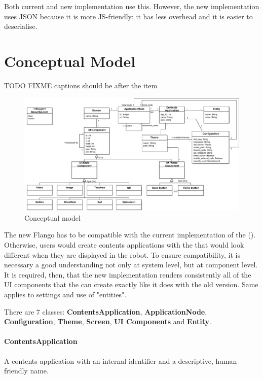 Both current and new implementation use this.
However, the new implementation uses \ac{JSON} because it is more \ac{JS}-friendly: it has less overhead and it is easier to deserialise.


\section{Conceptual Model}
TODO FIXME captions should be after the item

\begin{figure}   
    \centering
    \includegraphics[width=\textwidth]{figures/specification-conceptual-model}
    \caption{Conceptual model}
    \label{fig:specification-conceptual-model}
\end{figure}

The new Flango \cm has to be compatible with the current implementation of the \se (\flangofe).
Otherwise, users would create contents applications with the \se that would look different when they are displayed in the robot.
To ensure compatibility, it is necessary a good understanding not only at system level, but at component level.
It is required, then, that the new implementation renders consistently all of the \ac{UI} components that the \se can create exactly like it does with the old version. 
Same applies to settings and use of "entities".

There are 7 classes: \textbf{ContentsApplication}, \textbf{ApplicationNode}, \textbf{Configuration}, \textbf{Theme}, \textbf{Screen}, \textbf{UI Components} and \textbf{Entity}.

\paragraph{ContentsApplication} A contents application with an internal identifier and a descriptive, human-friendly name.

